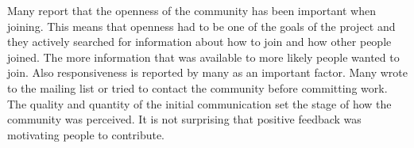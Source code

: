 Many report that the openness of the community has been important when joining. This means that openness had to be one of the goals of the project and they actively searched for information about how to join and how other people joined. The more information that was available to more likely people wanted to join. Also responsiveness is reported by many as an important factor. Many wrote to the mailing list or tried to contact the community before committing work. The quality and quantity of the initial communication set the stage of how the community was perceived. It is not surprising that positive feedback was motivating people to contribute.